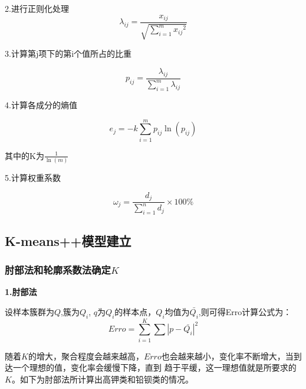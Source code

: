 \documentclass[UTF8]{ctexart}
\begin{document}
                2.进行正则化处理
                \begin{equation}
                    \lambda_{i j}=\frac{x_{i j}}{\sqrt{\sum_{i=1}^{m} x_{i j}{ }^{2}}}
                \end{equation}

                3.计算第j项下的第i个值所占的比重

                \begin{equation}
                    p_{i j}=\frac{\lambda_{i j}}{\sum_{i=1}^{m} \lambda_{i j}}
                \end{equation}

                4.计算各成分的熵值

                \begin{equation}
                    e_{j}=-k \sum_{i=1}^{m} p_{i j} \ln \left(p_{i j}\right)
                \end{equation}

                其中的K为$\frac{1}{\ln (m)}$

                5.计算权重系数

                \begin{equation}
                    \omega_{j}=\frac{d_{j}}{\sum_{i=1}^{n} d_{j}} \times 100 \%
                \end{equation}

                \subsection{K-means++模型建立}
                \subsubsection{肘部法和轮廓系数法确定$K$}
                \textbf{1.肘部法}

                设样本簇群为$Q$,簇为$Q_i$, $q$为$Q_i$的样本点，$Q_i$均值为$\bar{Q_i}$,则可得Erro计算公式为：
                \begin{equation}
                    Erro = \sum _{i=1} ^K \sum\left\lvert p-\bar{Q_i} \right\rvert ^2
                \end{equation}

                随着$K$的增大，聚合程度会越来越高，$Erro$也会越来越小，变化率不断增大，当到达一个理想的值，变化率会缓慢下降，直到
                趋于平缓，这一理想值就是所要求的$K$。如下为肘部法所计算出高钾类和铅钡类的情况。
\end{document}
